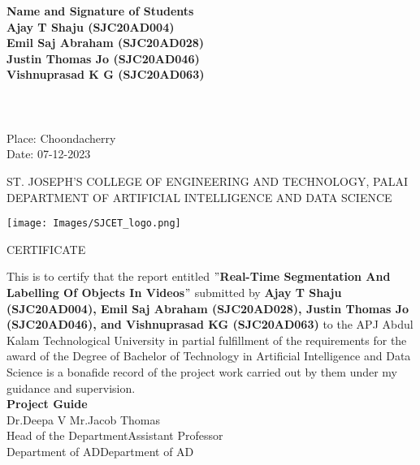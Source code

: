 {{\bf Name and Signature of Students}\vspace{0.5 cm}\\
{ \bf Ajay T Shaju (SJC20AD004)}\\
{ \bf Emil Saj Abraham (SJC20AD028)}\\
{ \bf Justin Thomas Jo (SJC20AD046)}\\
{ \bf Vishnuprasad K G (SJC20AD063)}\\[-0.6mm] \\\\\\
Place: Choondacherry\\ 
Date: 07-12-2023
 

\newpage
\thispagestyle{empty}
\begin{center}
\normalsize{ST. JOSEPH’S COLLEGE OF ENGINEERING AND TECHNOLOGY, PALAI}\\[0.5cm]
\normalsize
 { DEPARTMENT OF ARTIFICIAL INTELLIGENCE AND DATA SCIENCE}\\[1.0cm]%
   \begin{center}
   \texttt{[image: Images/SJCET\_logo.png]}
   \end{center}
{\large CERTIFICATE}\\[1cm]
\end{center}
\normalsize 
This is to certify that the report entitled {\bf $"$Real-Time Segmentation And Labelling Of Objects In Videos$"$} submitted by { \bf Ajay T Shaju (SJC20AD004), Emil Saj Abraham (SJC20AD028), Justin Thomas Jo (SJC20AD046), and Vishnuprasad KG (SJC20AD063)} to the APJ Abdul Kalam Technological University in partial fulfillment of the requirements for the award of the Degree of Bachelor of Technology in Artificial Intelligence and Data Science is a bonafide record of the project work carried out by them under my guidance and supervision.\vspace{1.3 cm}\\
{\bf Project Guide}\hspace{8.3 cm}{\bf Project Coordinator}\\
Dr.Deepa V\hspace{9.0 cm} Mr.Jacob Thomas\\
Head of the Department\hspace{6.85 cm}Assistant Professor\hspace{2.6 cm}\\Department of AD\hspace{7.9 cm}Department of AD
}
